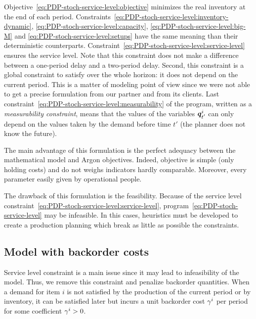 Objective~\eqref{eq:PDP-stoch-service-level:objective} minimizes the real inventory at the end of each period.
Constraints~\eqref{eq:PDP-stoch-service-level:inventory-dynamic}, \eqref{eq:PDP-stoch-service-level:capacity}, \eqref{eq:PDP-stoch-service-level:big-M} and \eqref{eq:PDP-stoch-service-level:setups} have the same meaning than their deterministic counterparts.
Constraint~\eqref{eq:PDP-stoch-service-level:service-level} ensures the service level. Note that this constraint does not make a difference between a one-period delay and a two-period delay. Second, this constraint is a global constraint to satisfy over the whole horizon: it does not depend on the current period. This is a matter of modeling point of view since we were not able to get a precise formulation from our partner and from its clients.
Last constraint~\eqref{eq:PDP-stoch-service-level:measurability} of the program, written as a {\em measurability constraint}, means that the values of the variables $\va\quantity_{t'}^i$ can only depend on the values taken by the demand before time $t'$ (the planner does not know the future).


The main advantage of this formulation is the perfect adequacy between the mathematical model and Argon objectives. Indeed, objective is simple (only holding costs) and do not weighs indicators hardly comparable. Moreover, every parameter easily given by operational people.

The drawback of this formulation is the feasibility. Because of the service level constraint~\eqref{eq:PDP-stoch-service-level:service-level}, program~\eqref{eq:PDP-stoch-service-level} may be infeasible. In this cases, heuristics must be developed to create a production planning which break as little as possible the constraints.



\subsection{Model with backorder costs}


Service level constraint is a main issue since it may lead to infeasibility of the model. Thus, we remove this constraint and penalize backorder quantities. When a demand for item $i$ is not satisfied by the production of the current period or by inventory, it can be satisfied later but incurs a unit backorder cost $\gamma^i$ per period for some coefficient $\gamma^i>0$.

